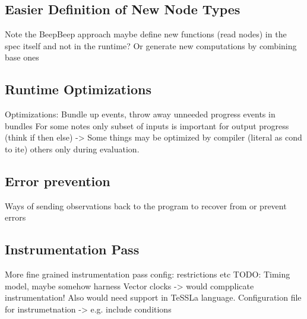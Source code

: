
\subsection{Easier Definition of New Node Types}
\label{sec:conclusion:further_work:node_definition}

Note the BeepBeep approach
maybe define new functions (read nodes) in the spec itself and not in the runtime? Or generate new computations by combining base ones

\subsection{Runtime Optimizations}
\label{sec:conclusion:further_work:runtime_optimizations}

Optimizations: Bundle up events, throw away unneeded progress events in  bundles
  For some notes only subset of inputs is important for output progress (think if then else)
    -> Some things may be optimized by compiler (literal as cond to ite) others only during evaluation.


\subsection{Error prevention}
\label{sec:conclusion:further_work:error_prevention}
Ways of sending observations back to the program to recover from or prevent errors


\subsection{Instrumentation Pass}
More fine grained instrumentation pass config: restrictions etc
TODO: Timing model, maybe somehow harness Vector clocks -> would  compplicate instrumentation! Also would need support in TeSSLa language.
Configuration file for instrumetnation -> e.g. include conditions
